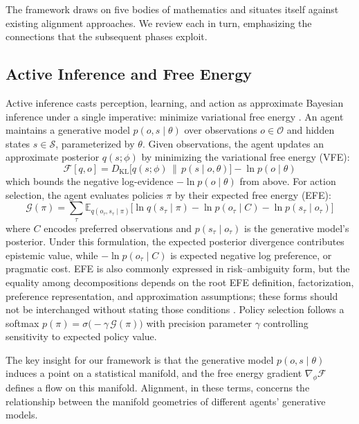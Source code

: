 \documentclass[11pt,a4paper]{article}
\theoremstyle{definition}
\newcommand{\E}{\mathbb{E}}
\newcommand{\VFE}{\mathcal{F}}
\newcommand{\EFE}{\mathcal{G}}
\newcommand{\cS}{\mathcal{S}}
\newcommand{\cO}{\mathcal{O}}
\newcommand{\dkl}{D_{\mathrm{KL}}}
\begin{document}
The framework draws on five bodies of mathematics and situates itself against existing alignment approaches. We review each in turn, emphasizing the connections that the subsequent phases exploit.

\subsection{Active Inference and Free Energy}
\label{sec:bg_aif}

Active inference casts perception, learning, and action as approximate Bayesian inference under a single imperative: minimize variational free energy \citep{friston2010free, parr2022active}. An agent maintains a generative model $p(o, s \mid \theta)$ over observations $o \in \cO$ and hidden states $s \in \cS$, parameterized by $\theta$. Given observations, the agent updates an approximate posterior $q(s; \phi)$ by minimizing the variational free energy (VFE):
\begin{equation}
  \VFE[q, o] = \dkl\bigl[q(s; \phi) \,\|\, p(s \mid o, \theta)\bigr] - \ln p(o \mid \theta)
  \label{eq:vfe}
\end{equation}
which bounds the negative log-evidence $-\ln p(o \mid \theta)$ from above. For action selection, the agent evaluates policies $\pi$ by their expected free energy (EFE):
\begin{equation}
  \EFE(\pi) = \sum_{\tau} \E_{q(o_\tau, s_\tau \mid \pi)}\bigl[\ln q(s_\tau \mid \pi) - \ln p(o_\tau \mid C) - \ln p(s_\tau \mid o_\tau)\bigr]
  \label{eq:efe}
\end{equation}
where $C$ encodes preferred observations and $p(s_\tau \mid o_\tau)$ is the generative model's posterior. Under this formulation, the expected posterior divergence contributes epistemic value, while $-\ln p(o_\tau \mid C)$ is expected negative log preference, or pragmatic cost. EFE is also commonly expressed in risk--ambiguity form, but the equality among decompositions depends on the root EFE definition, factorization, preference representation, and approximation assumptions; these forms should not be interchanged without stating those conditions \citep{parr2022active,millidge2021whence}. Policy selection follows a softmax $p(\pi) = \sigma\bigl(-\gamma \, \EFE(\pi)\bigr)$ with precision parameter $\gamma$ controlling sensitivity to expected policy value.

The key insight for our framework is that the generative model $p(o, s \mid \theta)$ induces a point on a statistical manifold, and the free energy gradient $\nabla_\phi \VFE$ defines a flow on this manifold. Alignment, in these terms, concerns the relationship between the manifold geometries of different agents' generative models.
\end{document}
